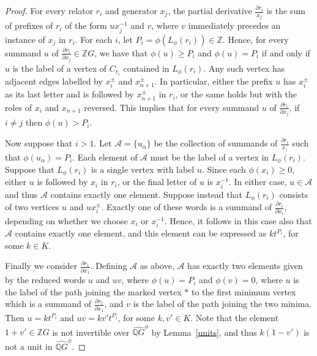 \begin{proof}

For every relator $r_i$ and generator $x_j$, the partial derivative $\frac{\partial r_i}{x_j}$ is the sum of prefixes of $r_i$ of the form $ux_j^{-1}$ and $v$, where $v$ immediately precedes an instance of $x_j$ in $r_i$. For each $i$, let $P_i = \phi(L_{\phi}(r_i)) \in \mathbb{Z}$. Hence, for every summand $u$ of $\frac{\partial r_i}{\partial x_j} \in \mathbb{Z}G$, we have that $\phi(u) \geq P_i$ and $\phi(u) = P_i$ if and only if $u$ is the label of a vertex of $C_{r_i}$ contained in $L_{\phi}(r_i)$. Any such vertex has adjacent edges labelled by $x_i^{\pm}$ and $x_{n+1}^{\pm}$. In particular, either the prefix $u$ has $x_i^{\pm}$ as its last letter and is followed by $x_{n+1}^{\pm}$ in $r_i$, or the same holds but with the roles of $x_i$ and $x_{n+1}$ reversed. This implies that for every summand $u$ of $\frac{\partial r_i}{\partial x_j}$, if $i \neq j$ then $\phi(u) > P_i$.

Now suppose that $i > 1$. Let $\mathcal{A} = \{u_{\alpha}\}$ be the collection of summands of $\frac{\partial r_i}{x_i}$ such that $\phi(u_{\alpha}) = P_i$. Each element of $\mathcal{A}$ must be the label of a vertex in $L_{\phi}(r_i)$.  Suppose that $L_{\phi}(r_i)$ is a single vertex with label $u$. Since each $\phi(x_i) \geq 0$,  either $u$ is followed by $x_i$ in $r_i$, or the final letter of $u$ is $x_i^{-1}$. In either case, $u \in \mathcal{\mathcal{A}}$ and thus $\mathcal{A}$ contains exactly one element. Suppose instead that $L_{\phi}(r_i)$ consists of two vertices $u$ and $ux_i^{\pm}$. Exactly one of these words is a summand of $\frac{\partial r_i}{\partial x_i}$, depending on whether we choose $x_i$ or $x_i^{-1}$. Hence, it follows in this case also that $\mathcal{A}$ contains exactly one element, and this element can be expressed as $kt^{P_i}$, for some $k \in K$.

Finally we consider $\frac{\partial r_1}{\partial x_1}$. Defining $\mathcal{A}$ as above, $\mathcal{A}$ has exactly two elements given by the reduced words $u$ and $uv$, where $\phi(u) = P_i$ and $\phi(v) = 0$, where $u$ is the label of the path joining the marked vertex $\ast$ to the first minimum vertex which is a summand of $\frac{\partial r_1}{\partial x_1}$, and $v$ is the label of the path joining the two minima. Then $u = kt^{P_i}$ and $uv = kv't^{P_i}$, for some $k, v' \in K$. Note that the element $1+v' \in \mathbb{Z}G$ is not invertible over $\widehat{\mathbb{Q}G}^{\phi}$ by Lemma~\ref{units}, and thus $k(1-v')$ is not a unit in $\widehat{\mathbb{Q}G}^{\phi}$.\end{proof}

